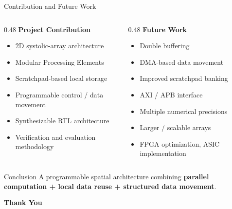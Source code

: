 \documentclass[aspectratio=169,10pt]{beamer}
\begin{document}
\begin{frame}{Contribution and Future Work}
  \begin{columns}[T]
    \begin{column}{0.48\textwidth}
      \textbf{\small Project Contribution}
      \begin{itemize}\small
        \item 2D systolic-array architecture
        \item Modular Processing Elements
        \item Scratchpad-based local storage
        \item Programmable control / data movement
        \item Synthesizable RTL architecture
        \item Verification and evaluation methodology
      \end{itemize}
    \end{column}
    \begin{column}{0.48\textwidth}
      \textbf{\small Future Work}
      \begin{itemize}\small
        \item Double buffering
        \item DMA-based data movement
        \item Improved scratchpad banking
        \item AXI / APB interface
        \item Multiple numerical precisions
        \item Larger / scalable arrays
        \item FPGA optimization, ASIC implementation
      \end{itemize}
    \end{column}
  \end{columns}
  \vspace{3mm}
  \begin{block}{Conclusion}
    \small A programmable spatial architecture combining \textbf{parallel computation + local data reuse + structured data movement}.
  \end{block}
  \vspace{4mm}
  \centering \Large \textbf{Thank You} \\ \normalsize 
\end{frame}
\end{document}
